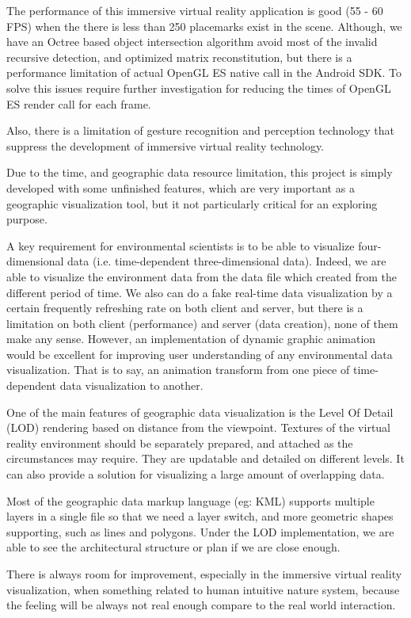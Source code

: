 The performance of this immersive virtual reality application is good (55 - 60 FPS) when the there is less than 250 placemarks exist in the scene. Although, we have an Octree based object intersection algorithm avoid most of the invalid recursive detection, and optimized matrix reconstitution, but there is a performance limitation of actual OpenGL ES native call in the Android SDK. To solve this issues require further investigation for reducing the times of OpenGL ES render call for each frame. 

Also, there is a limitation of gesture recognition and perception technology that suppress the development of immersive virtual reality technology.

Due to the time, and geographic data resource limitation, this project is simply developed with some unfinished features, which are very important as a geographic visualization tool, but it not particularly critical for an exploring purpose.

A key requirement for environmental scientists is to be able to visualize four-dimensional data (i.e. time-dependent three-dimensional data). Indeed, we are able to visualize the environment data from the data file which created from the different period of time. We also can do a fake real-time data visualization by a certain frequently refreshing rate on both client and server, but there is a limitation on both client (performance) and server (data creation), none of them make any sense. However, an implementation of dynamic graphic animation would be excellent for improving user understanding of any environmental data visualization. That is to say, an animation transform from one piece of time-dependent data visualization to another.

One of the main features of geographic data visualization is the Level Of Detail (LOD) rendering based on distance from the viewpoint. Textures of the virtual reality environment should be separately prepared, and attached as the circumstances may require. They are updatable and detailed on different levels. It can also provide a solution for visualizing a large amount of overlapping data.

Most of the geographic data markup language (eg: KML) supports multiple layers in a single file so that we need a layer switch, and more geometric shapes supporting, such as lines and polygons. Under the LOD implementation, we are able to see the architectural structure or plan if we are close enough.

There is always room for improvement, especially in the immersive virtual reality visualization, when something related to human intuitive nature system, because the feeling will be always not real enough compare to the real world interaction.

